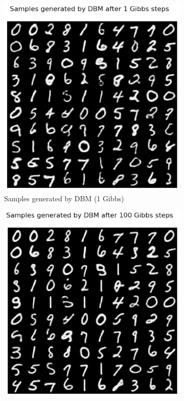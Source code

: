 \documentclass{article}
\begin{document}
\begin{figure}[h!]
     \centering
     \begin{subfigure}[b]{0.3\textwidth}
         \centering
         \includegraphics[width=.9\textwidth]{lab4/dbmgibb1.pdf}
         \caption{Samples generated by DBM (1 Gibbs)}
         \label{fig:dbm1gibb}
     \end{subfigure}
     \hfill
     \begin{subfigure}[b]{0.3\textwidth}
         \centering
         \includegraphics[width=.9\textwidth]{lab4/dbm100gibb.pdf}

\end{subfigure}
\end{figure}
\end{document}
